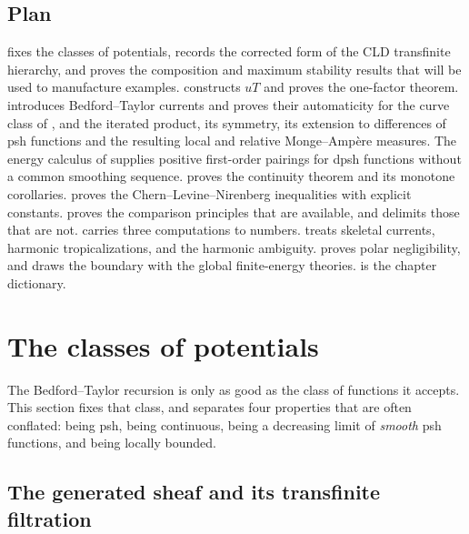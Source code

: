 \subsection{Plan}
\label{sec:ch16-plan}

 fixes the classes of potentials, records the
corrected form of the CLD transfinite hierarchy, and proves the composition
and maximum stability results that will be used to manufacture examples.
 constructs $uT$ and proves the one-factor
theorem.   introduces Bedford--Taylor currents
and proves their automaticity for the curve class of
, and  the iterated
product, its symmetry, its
extension to differences of psh functions and the resulting local and
relative Monge--Amp\`ere measures.  The energy calculus of
 supplies positive first-order pairings for
dpsh functions without a common smoothing sequence.
 proves the
continuity theorem and its monotone corollaries.
 proves the Chern--Levine--Nirenberg inequalities with
explicit constants.   proves the comparison
principles that are available, and delimits those that are not.
 carries three computations to numbers.
 treats skeletal currents,
 harmonic tropicalizations, and
 the harmonic ambiguity.
 proves polar negligibility, and
 draws the boundary with the global
finite-energy theories.   is the chapter
dictionary.

\section{The classes of potentials}
\label{sec:ch16-psh-classes}

The Bedford--Taylor recursion is only as good as the class of functions it
accepts.  This section fixes that class, and separates four properties that
are often conflated: being psh, being continuous, being a decreasing limit
of \emph{smooth} psh functions, and being locally bounded.

\subsection{The generated sheaf and its transfinite filtration}
\label{sec:ch16-hierarchy}

